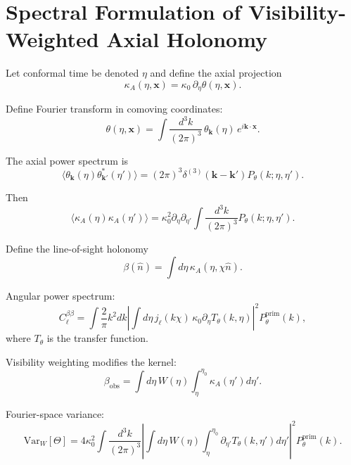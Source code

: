 \documentclass[12pt]{article}
\begin{document}
\section{Spectral Formulation of Visibility-Weighted Axial Holonomy}

Let conformal time be denoted $\eta$ and define the axial projection
\begin{equation}
\kappa_A(\eta,\mathbf{x})
=
\kappa_0 \, \partial_\eta \theta(\eta,\mathbf{x}).
\end{equation}

Define Fourier transform in comoving coordinates:
\begin{equation}
\theta(\eta,\mathbf{x})
=
\int \frac{d^3k}{(2\pi)^3}
\, \theta_{\mathbf{k}}(\eta)
\, e^{i \mathbf{k}\cdot \mathbf{x}}.
\end{equation}

The axial power spectrum is
\begin{equation}
\langle
\theta_{\mathbf{k}}(\eta)
\theta_{\mathbf{k}'}^*(\eta')
\rangle
=
(2\pi)^3
\delta^{(3)}(\mathbf{k}-\mathbf{k}')
P_\theta(k;\eta,\eta').
\end{equation}

Then
\begin{equation}
\langle
\kappa_A(\eta)
\kappa_A(\eta')
\rangle
=
\kappa_0^2
\partial_\eta \partial_{\eta'}
\int \frac{d^3k}{(2\pi)^3}
P_\theta(k;\eta,\eta').
\end{equation}

Define the line-of-sight holonomy
\begin{equation}
\beta(\hat n)
=
\int d\eta \,
\kappa_A(\eta,\chi\hat n).
\end{equation}

Angular power spectrum:
\begin{equation}
C_\ell^{\beta\beta}
=
\int \frac{2}{\pi} k^2 dk
\left|
\int d\eta \,
j_\ell(k\chi)
\, \kappa_0 \partial_\eta T_\theta(k,\eta)
\right|^2
P_\theta^{\mathrm{prim}}(k),
\end{equation}
where $T_\theta$ is the transfer function.

Visibility weighting modifies the kernel:
\begin{equation}
\beta_{\mathrm{obs}}
=
\int d\eta \,
W(\eta)
\int_{\eta}^{\eta_0}
\kappa_A(\eta') d\eta'.
\end{equation}

Fourier-space variance:
\begin{equation}
\mathrm{Var}_W[\Theta]
=
4\kappa_0^2
\int \frac{d^3k}{(2\pi)^3}
\left|
\int d\eta \,
W(\eta)
\int_{\eta}^{\eta_0}
\partial_{\eta'} T_\theta(k,\eta')
d\eta'
\right|^2
P_\theta^{\mathrm{prim}}(k).
\end{equation}
\end{document}
